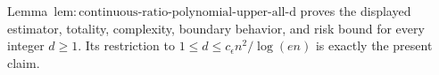 Lemma~\(\mathrm{lem:continuous\text{-}ratio\text{-}polynomial\text{-}upper\text{-}all\text{-}d}\) proves the displayed estimator, totality, complexity, boundary behavior, and risk bound for every integer \(d\ge1\).  Its restriction to \(1\le d\le c_{\epsilon}n^2/\log(en)\) is exactly the present claim.
